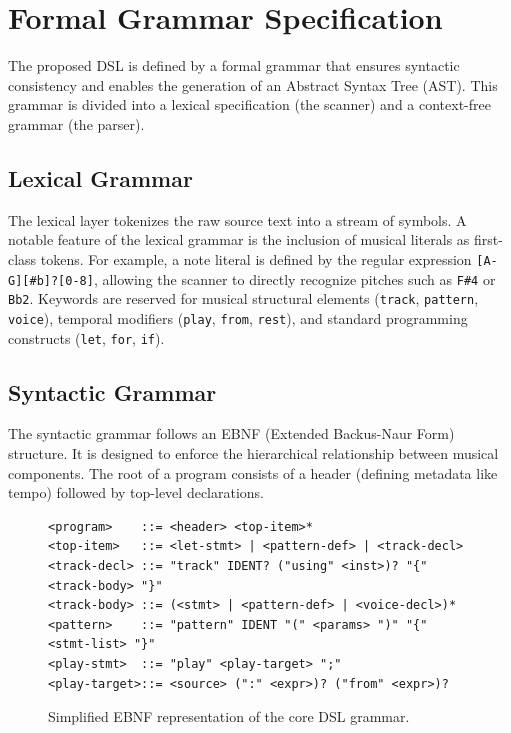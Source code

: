 \section{Formal Grammar Specification}\label{sec:formal-grammar}

The proposed DSL is defined by a formal grammar that ensures syntactic consistency and enables the generation
of an Abstract Syntax Tree (AST).
This grammar is divided into a lexical specification (the scanner) and a context-free grammar (the parser).

\subsection{Lexical Grammar}

The lexical layer tokenizes the raw source text into a stream of symbols.
A notable feature of the lexical grammar is the inclusion of musical literals as first-class tokens.
For example, a note literal is defined by the regular expression \texttt{[A-G][\#b]?[0-8]}, allowing the
scanner to directly recognize pitches such as \texttt{F\#4} or \texttt{Bb2}.
Keywords are reserved for musical structural elements (\texttt{track}, \texttt{pattern}, \texttt{voice}),
temporal modifiers (\texttt{play}, \texttt{from}, \texttt{rest}), and standard programming constructs
(\texttt{let}, \texttt{for}, \texttt{if}).

\subsection{Syntactic Grammar}

The syntactic grammar follows an EBNF (Extended Backus-Naur Form) structure.
It is designed to enforce the hierarchical relationship between musical components.
The root of a program consists of a header (defining metadata like tempo) followed by top-level declarations.

\begin{figure}[htbp]
  \centering
  \begin{small}
    \begin{verbatim}
<program>    ::= <header> <top-item>*
<top-item>   ::= <let-stmt> | <pattern-def> | <track-decl>
<track-decl> ::= "track" IDENT? ("using" <inst>)? "{" <track-body> "}"
<track-body> ::= (<stmt> | <pattern-def> | <voice-decl>)*
<pattern>    ::= "pattern" IDENT "(" <params> ")" "{" <stmt-list> "}"
<play-stmt>  ::= "play" <play-target> ";"
<play-target>::= <source> (":" <expr>)? ("from" <expr>)?
    \end{verbatim}
  \end{small}
  \caption{Simplified EBNF representation of the core DSL grammar.}
  \label{fig:simplified-grammar}
\end{figure}

